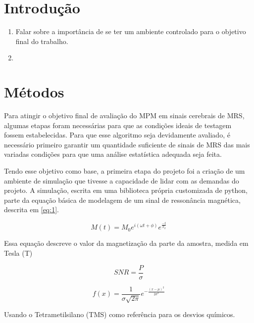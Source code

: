 \documentclass{article}
\begin{document}
\section{Introdução}

\begin{enumerate}
    \item Falar sobre a importância de se ter um ambiente controlado para o objetivo final do trabalho.
    \item 
\end{enumerate}

\section{Métodos}

Para atingir o objetivo final de avaliação do MPM em sinais cerebrais de MRS, algumas etapas foram 
necessárias para que as condições ideais de testagem fossem estabelecidas. Para que esse algoritmo 
seja devidamente avaliado, é necessário primeiro garantir um quantidade suficiente de sinais de 
MRS das mais variadas condições para que uma análise estatística adequada seja feita. 

Tendo esse objetivo como base, a primeira etapa do projeto foi a criação de um ambiente de simulação
que tivesse a capacidade de lidar com as demandas do projeto. A simulação, escrita em uma biblioteca 
própria customizada de python, parte da equação básica de modelagem de um sinal de ressonância magnética, 
descrita em \ref{eq:1}.

\begin{equation} \label{eq:1}
    M(t) = M_0 e^{i(\omega t + \phi)} e^{\frac{-t}{T_2}}
\end{equation}

Essa equação descreve o valor da magnetização da parte da amostra, medida em Tesla (T)

\begin{equation} \label{eq:2}
    SNR = \frac{P}{\sigma}
\end{equation}

\begin{equation} \label{eq:3}
    f(x) = \frac{1}{\sigma \sqrt{2\pi}}e^{-\frac{(x - \mu)^2}{2\sigma ^2}}
\end{equation}

Usando o Tetrametilsilano (TMS) como referência para os desvios químicos.
\end{document}
